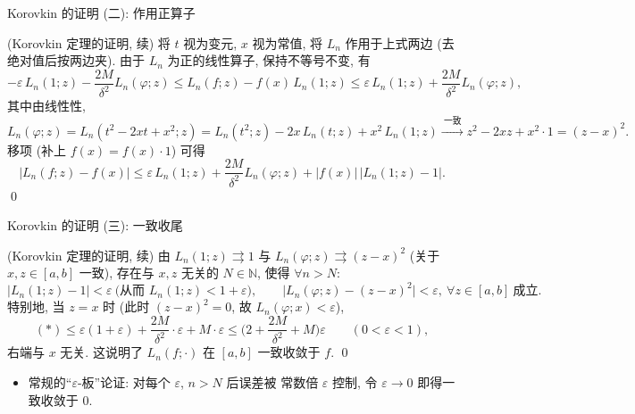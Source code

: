 
\begin{frame}{Korovkin 的证明 (二): 作用正算子}

\graymode

\startproof[bg=yellow, fg=red](Korovkin 定理的证明, 续)
将 $t$ 视为变元, $x$ 视为常值, 将 $L_n$ 作用于上式两边 (去绝对值后按两边夹).
由于 $L_n$ 为正的线性算子, 保持不等号不变, 有
\[
- \varepsilon \, L_n(1; z) - \frac{2M}{\delta^2} L_n(\varphi; z)
\leqslant L_n(f; z) - f(x) \, L_n(1; z)
\leqslant \varepsilon \, L_n(1; z) + \frac{2M}{\delta^2} L_n(\varphi; z),
\]
\pause
其中由线性性,
\[
L_n(\varphi; z) = L_n(t^2 - 2xt + x^2; z)
= L_n(t^2; z) - 2x \, L_n(t; z) + x^2 \, L_n(1; z)
\xrightarrow{\ \text{一致}\ } z^2 - 2xz + x^2 \cdot 1 = (z - x)^2 .
\]
\pause
移项 (补上 $f(x) = f(x) \cdot 1$) 可得
\[
\big| L_n(f; z) - f(x) \big|
\leqslant \varepsilon \, L_n(1; z)
+ \frac{2M}{\delta^2} L_n(\varphi; z)
+ |f(x)| \, \big| L_n(1; z) - 1 \big| .
\tag{$*$}
\]
\qed

\normalmode

\end{frame}


\begin{frame}{Korovkin 的证明 (三): 一致收尾}

\graymode

\startproof[bg=yellow, fg=red](Korovkin 定理的证明, 续)
由 $L_n(1; z) \rightrightarrows 1$ 与 $L_n(\varphi; z) \rightrightarrows (z-x)^2$
(关于 $x, z \in [a,b]$ 一致), 存在与 $x, z$ 无关的 $N \in \mathbb{N}$,
使得 $\forall n > N$:
\[
\big| L_n(1; z) - 1 \big| < \varepsilon
\ \Big( \text{从而 } L_n(1; z) < 1 + \varepsilon \Big),
\qquad
\big| L_n(\varphi; z) - (z - x)^2 \big| < \varepsilon ,
\ \forall z \in [a,b] \ \text{成立}.
\]
\pause
特别地, 当 $z = x$ 时 (此时 $(z-x)^2 = 0$, 故 $L_n(\varphi; x) < \varepsilon$),
\[
(*) \leqslant \varepsilon (1 + \varepsilon) + \frac{2M}{\delta^2} \cdot \varepsilon
+ M \cdot \varepsilon
\leqslant \Big( 2 + \frac{2M}{\delta^2} + M \Big) \varepsilon
\qquad (0 < \varepsilon < 1),
\]
右端与 $x$ 无关. 这说明了 $L_n(f; \cdot)$ 在 $[a,b]$ 一致收敛于 $f$.
\qed

\pause

\begin{itemize}
\item 常规的``$\varepsilon$-板''论证: 对每个 $\varepsilon$, $n > N$ 后误差被
  \alert{常数倍} $\varepsilon$ 控制, 令 $\varepsilon \to 0$ 即得一致收敛于 $0$.
\end{itemize}

\normalmode

\end{frame}

